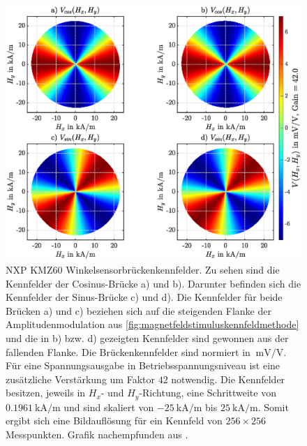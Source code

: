 	
	\clearpage
	\begin{figure}[tbph]
		\centering
		\includegraphics[width=\linewidth]{chapters/images/KMZ60_Kennfelder}
		\caption[NXP KMZ60 Winkelsensorbrückenkennfelder]{NXP KMZ60 Winkelsensorbrückenkennfelder. Zu sehen sind die 
		Kennfelder der Cosinus-Brücke a) und b). Darunter befinden sich die Kennfelder der Sinus-Brücke c) und d). 
		Die Kennfelder für beide Brücken a) und c) beziehen sich auf die steigenden Flanke der Amplitudenmodulation aus 
		\autoref{fig:magnetfeldstimuluskennfeldmethode} und die in b) bzw. d) gezeigten Kennfelder sind gewonnen aus 
		der fallenden Flanke. Die Brückenkennfelder sind normiert in $\SI{}{\milli\volt\per\volt}$. Für eine 
		Spannungsausgabe in Betriebsspannungsniveau ist eine zusätzliche Verstärkung um Faktor $42$ notwendig. Die 
		Kennfelder besitzen, jeweils in $H_x$- und $H_y$-Richtung, eine Schrittweite von 
		$\SI{0.1961}{\kilo\ampere\per\metre}$ und sind skaliert von $\SI{-25}{\kilo\ampere\per\metre}$ bis 
		$\SI{+25}{\kilo\ampere\per\metre}$. Somit ergibt sich eine Bildauflösung für ein Kennfeld von $256 \times 256$ 
		Messpunkten. Grafik nachempfunden aus \cite{Schuethe2019}.}
		\label{fig:kmz60kennfelder}
	\end{figure}
	
